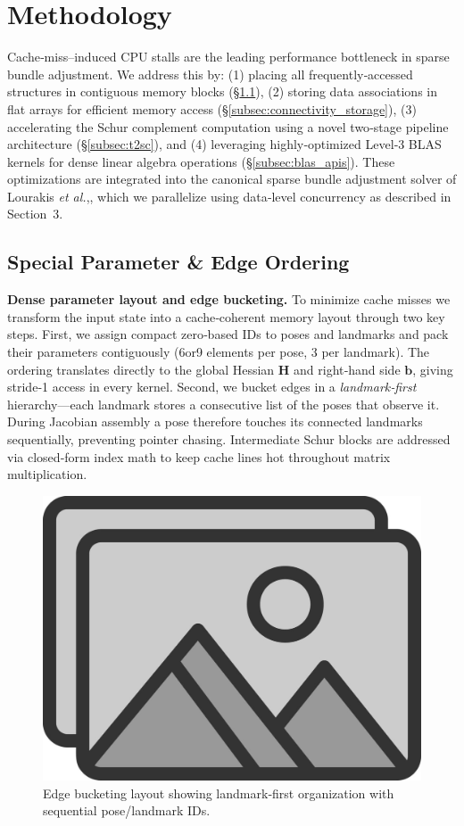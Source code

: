 \section{Methodology}
\label{sec:methodology}

Cache‑miss–induced CPU stalls are the leading performance bottleneck in sparse bundle adjustment.
We address this by: (1) placing all frequently‑accessed structures in contiguous memory blocks
(\S\ref{subsec:parameter_ordering}), (2) storing data associations in flat arrays for efficient memory access
(\S\ref{subsec:connectivity_storage}), (3) accelerating the Schur complement computation using a novel 
two‑stage pipeline architecture (\S\ref{subsec:t2sc}), and (4) leveraging highly‑optimized Level‑3 BLAS 
kernels for dense linear algebra operations (\S\ref{subsec:blas_apis}). These optimizations are integrated 
into the canonical sparse bundle adjustment solver of 
Lourakis \textit{et al.},\cite{lourakis2004design,lourakis2009sba}, which we parallelize using data‑level 
concurrency as described in Section~3.

\subsection{Special Parameter \& Edge Ordering}
\label{subsec:parameter_ordering}

\textbf{Dense parameter layout and edge bucketing.} To minimize cache misses we transform the
input state into a cache‑coherent memory layout through two key steps. First, we assign compact
zero‑based IDs to poses and landmarks and pack their parameters contiguously (6or9 elements per
pose, 3 per landmark). The ordering translates directly to the global Hessian $\mathbf H$ and right‑hand
side $\mathbf b$, giving stride‑1 access in every kernel. Second, we bucket edges in a
\emph{landmark‑first} hierarchy—each landmark stores a consecutive list of the poses that observe it.
During Jacobian assembly a pose therefore touches its connected landmarks sequentially, preventing
pointer chasing. Intermediate Schur blocks are addressed via closed‑form index math to keep cache
lines hot throughout matrix multiplication.

\begin{figure}[t]
\centering
\includegraphics[width=0.75\linewidth]{figs/placeholder}
\caption{Edge bucketing layout showing landmark‑first organization with sequential pose/landmark IDs.}
\label{fig:dense_layout}
\end{figure}

